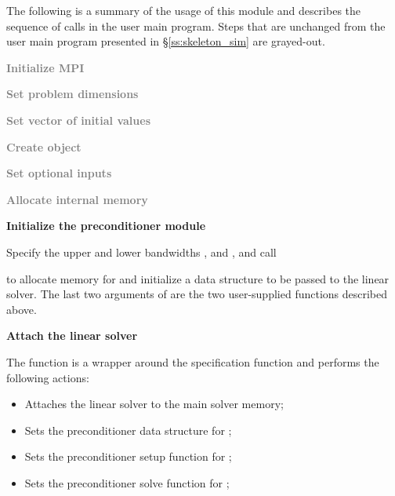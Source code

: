 The following is a summary of the usage of this module and describes the sequence 
of calls in the user main program. Steps that are unchanged from the user main
program presented in \S\ref{ss:skeleton_sim} are grayed-out.
\begin{Steps}
\item 
  \textcolor{gray}{\bf Initialize MPI}

\item
  \textcolor{gray}{\bf Set problem dimensions}

\item
  \textcolor{gray}{\bf Set vector of initial values}
 
\item
  \textcolor{gray}{\bf Create {\ida} object}

\item
  \textcolor{gray}{\bf Set optional inputs}

\item
  \textcolor{gray}{\bf Allocate internal memory}

\item \label{i:bbdpre_init}
  {\bf Initialize the {\idabbdpre} preconditioner module}

  Specify the upper and lower bandwidths ,  and
  ,  and call 


  to allocate memory for and initialize a data structure  to be 
  passed to the {\idaspgmr} linear solver. The last two arguments of 
  are the two user-supplied functions described above.

\item \label{i:bbdpre_attach}
  {\bf Attach the {\idaspgmr} linear solver}


  The function  is a wrapper around the {\idaspgmr} specification
  function  and performs the following actions:
  \begin{itemize}
    \item Attaches the {\idaspgmr} linear solver to the main {\ida} solver memory;
    \item Sets the preconditioner data structure for {\idabbdpre};
    \item Sets the preconditioner setup function for {\idabbdpre};
    \item Sets the preconditioner solve function for {\idabbdpre};
  \end{itemize}


\end{Steps}
